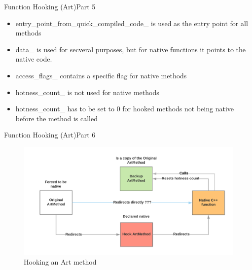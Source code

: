 \begin{frame}{Function Hooking (Art)}{Part 5}
    \begin{itemize}
    \item  entry\_point\_from\_quick\_compiled\_code\_ is used as the entry point for all methods
    \item data\_ is used for secveral purposes, but for native functions it points to the native code.
    \item access\_flags\_ contains a specific flag for native methods
    \item hotness\_count\_ is not used for native methods 
    \item hotness\_count\_ has to be set to 0 for hooked methods not being native before the method is called
    \end{itemize}
\end{frame}


\begin{frame}[fragile]{Function Hooking (Art)}{Part 6}

\begin{figure}[H]
	\begin{center}
	\hspace*{-1cm}
		\includegraphics[scale=0.75]{figures/HookProcess.png}
	\end{center}
	\caption{Hooking an Art method}
	\label{HookEndResult}
\end{figure}


\end{frame}


